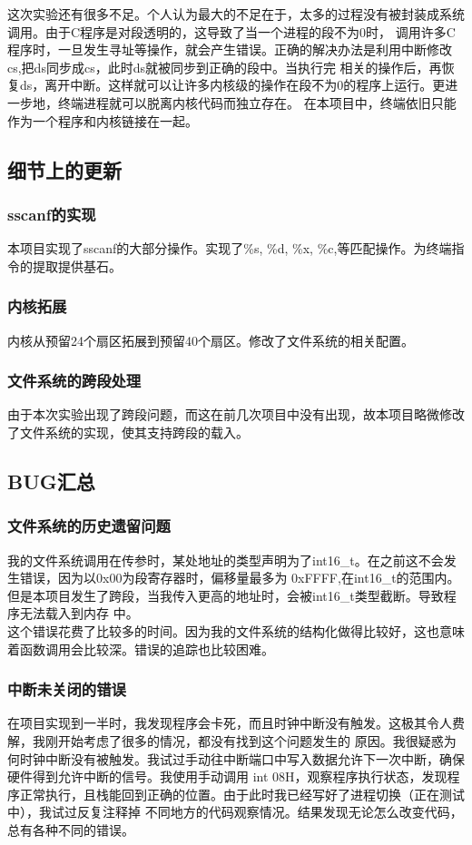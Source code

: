 \documentclass[a4paper]{article}
\begin{document}
    这次实验还有很多不足。个人认为最大的不足在于，太多的过程没有被封装成系统调用。由于C程序是对段透明的，这导致了当一个进程的段不为0时，
    调用许多C程序时，一旦发生寻址等操作，就会产生错误。正确的解决办法是利用中断修改cs,把ds同步成cs，此时ds就被同步到正确的段中。当执行完
    相关的操作后，再恢复ds，离开中断。这样就可以让许多内核级的操作在段不为0的程序上运行。更进一步地，终端进程就可以脱离内核代码而独立存在。
    在本项目中，终端依旧只能作为一个程序和内核链接在一起。
    \subsection{细节上的更新}
    \subsubsection{sscanf的实现}
    本项目实现了sscanf的大部分操作。实现了\%s, \%d, \%x, \%c,等匹配操作。为终端指令的提取提供基石。
    \subsubsection{内核拓展}
    内核从预留24个扇区拓展到预留40个扇区。修改了文件系统的相关配置。
    \subsubsection{文件系统的跨段处理}
    由于本次实验出现了跨段问题，而这在前几次项目中没有出现，故本项目略微修改了文件系统的实现，使其支持跨段的载入。
    \subsection{BUG汇总}\label{sec:bug}
    \subsubsection{文件系统的历史遗留问题}
    我的文件系统调用在传参时，某处地址的类型声明为了int16\_t。在之前这不会发生错误，因为以0x00为段寄存器时，偏移量最多为
    0xFFFF,在int16\_t的范围内。但是本项目发生了跨段，当我传入更高的地址时，会被int16\_t类型截断。导致程序无法载入到内存
    中。\\ 

    这个错误花费了比较多的时间。因为我的文件系统的结构化做得比较好，这也意味着函数调用会比较深。错误的追踪也比较困难。
    \subsubsection{中断未关闭的错误}
    在项目实现到一半时，我发现程序会卡死，而且时钟中断没有触发。这极其令人费解，我刚开始考虑了很多的情况，都没有找到这个问题发生的
    原因。我很疑惑为何时钟中断没有被触发。我试过手动往中断端口中写入数据允许下一次中断，确保硬件得到允许中断的信号。我使用手动调用
    int 08H，观察程序执行状态，发现程序正常执行，且栈能回到正确的位置。由于此时我已经写好了进程切换（正在测试中），我试过反复注释掉
    不同地方的代码观察情况。结果发现无论怎么改变代码，总有各种不同的错误。\\ 
\end{document}
